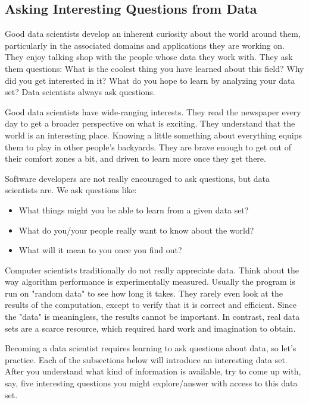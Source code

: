 \documentclass[10pt]{article}
\begin{document}
\subsection*{Asking Interesting Questions from Data}
Good data scientists develop an inherent curiosity about the world around them, particularly in the associated domains and applications they are working on. They enjoy talking shop with the people whose data they work with. They ask them questions: What is the coolest thing you have learned about this field? Why did you get interested in it? What do you hope to learn by analyzing your data set? Data scientists always ask questions.

Good data scientists have wide-ranging interests. They read the newspaper every day to get a broader perspective on what is exciting. They understand that the world is an interesting place. Knowing a little something about everything equips them to play in other people's backyards. They are brave enough to get out of their comfort zones a bit, and driven to learn more once they get there.

Software developers are not really encouraged to ask questions, but data scientists are. We ask questions like:

\begin{itemize}
  \item What things might you be able to learn from a given data set?
  \item What do you/your people really want to know about the world?
  \item What will it mean to you once you find out?
\end{itemize}

Computer scientists traditionally do not really appreciate data. Think about the way algorithm performance is experimentally measured. Usually the program is run on "random data" to see how long it takes. They rarely even look at the results of the computation, except to verify that it is correct and efficient. Since the "data" is meaningless, the results cannot be important. In contrast, real data sets are a scarce resource, which required hard work and imagination to obtain.

Becoming a data scientist requires learning to ask questions about data, so let's practice. Each of the subsections below will introduce an interesting data set. After you understand what kind of information is available, try to come up with, say, five interesting questions you might explore/answer with access to this data set.
\end{document}
